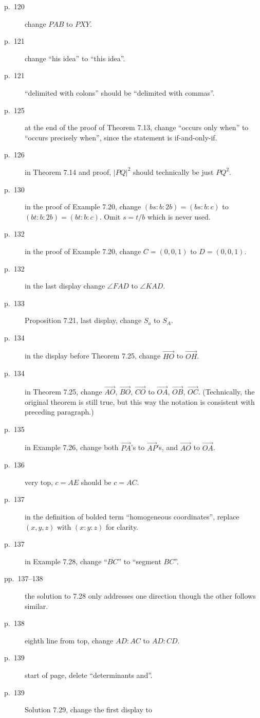 \documentclass[11pt]{scrartcl}
\begin{document}
\begin{description}
\item[p.\  120] change $PAB$ to $PXY$.
\item[p.\  121] change ``his idea'' to ``this idea''.
\item[p.\  121] ``delimited with colons'' should be
  ``delimited with commas''.
\item[p.\  125] at the end of the proof of Theorem 7.13,
  change ``occurs only when'' to ``occurs precisely when'',
  since the statement is if-and-only-if.
\item[p.\  126] in Theorem 7.14 and proof, $|PQ|^2$ should technically be just $PQ^2$.
\item[p.\  130] in the proof of Example 7.20, change $(bs:b:2b)=(bs:b:c)$ to $(bt:b:2b)=(bt:b:c)$.
  Omit $s=t/b$ which is never used.
\item[p.\  132] in the proof of Example 7.20, change $C = (0, 0, 1)$ to $D = (0, 0, 1)$.
\item[p.\  132] in the last display change $\angle FAD$ to $\angle KAD$.
\item[p.\  133] Proposition 7.21, last display, change $S_a$ to $S_A$.
\item[p.\  134] in the display before Theorem 7.25,
  change $\overrightarrow{HO}$ to $\overrightarrow{OH}$.
\item[p.\  134] in Theorem 7.25, change
  $\overrightarrow{AO}$, $\overrightarrow{BO}$, $\overrightarrow{CO}$ to
  $\overrightarrow{OA}$, $\overrightarrow{OB}$, $\overrightarrow{OC}$.
  (Technically, the original theorem is still true,
  but this way the notation is consistent with preceding paragraph.)
\item[p.\  135] in Example 7.26, change both $\overrightarrow{PA}$'s to $\overrightarrow{AP}$'s,
  and $\overrightarrow{AO}$ to $\overrightarrow{OA}$.
\item[p.\  136] very top, $c=AE$ should be $c=AC$.
\item[p.\  137] in the definition of bolded term ``homogeneous coordinates'',
  replace $(x,y,z)$ with $(x:y:z)$ for clarity.
\item[p.\  137] in Example 7.28, change ``$\overline{BC}$'' to ``segment $BC$''.
\item[pp.\  137--138] the solution to 7.28 only addresses one direction
  though the other follows similar.
\item[p.\  138] eighth line from top, change $AD:AC$ to $AD:CD$.
\item[p.\  139] start of page, delete ``determinants and''.
\item[p.\  139] Solution 7.29, change the first display to

\end{description}
\end{document}
